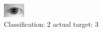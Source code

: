 \begin{figure}[h!]
\begin{center}
\includegraphics[width=0.60\columnwidth]{figures/ID1176_class_2_target_3.png}
\end{center}
\caption{ Classification: 2 actual target: 3}
\label{fig:ID1176_class_2_target_3}
\end{figure}
